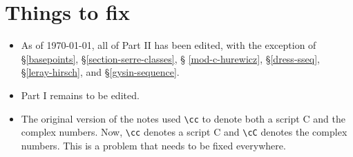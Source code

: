 \section*{Things to fix}
\begin{itemize}
    \item As of \today, all of Part II has been edited, with the exception of
	\S \ref{basepoints}, \S \ref{section-serre-classes}, \S
	\ref{mod-c-hurewicz}, \S \ref{dress-sseq}, \S \ref{leray-hirsch}, and
	\S \ref{gysin-sequence}.
    \item Part I remains to be edited.
    \item The original version of the notes used \verb|\cc| to denote both a
	script C and the complex numbers.  Now, \verb|\cc| denotes a script C
	and \verb|\cC| denotes the complex numbers. This is a problem that
	needs to be fixed everywhere.
\end{itemize}

